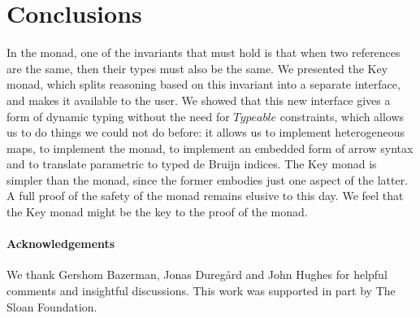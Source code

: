 \documentclass{sigplanconf}
\newcommand{\Conid}[1]{\mathit{#1}}
\begin{document}
\section{Conclusions}

In the \st{} monad, one of the invariants that must hold is that when two references are the same, then their types must also be the same. We presented the Key monad, which splits reasoning based on this invariant into a separate interface, and makes it available to the user. We showed that this new interface gives a form of dynamic typing without the need for \ensuremath{\Conid{Typeable}} constraints, which allows us to do things we could not do before: it allows us to implement heterogeneous maps, to implement the \st{} monad, to implement an embedded form of arrow syntax and to translate parametric \hoas{} to typed de Bruijn indices. The Key monad is simpler than the \st{} monad, since the former embodies just one aspect of the latter. A full proof of the safety of the \st{} monad remains elusive to this day. We feel that the Key monad might be the key to the proof of the \st{} monad. 

\paragraph{Acknowledgements}
We thank Gershom Bazerman, Jonas Dure\-g{\aa}rd and John Hughes for helpful comments and insightful discussions. This work was supported in part by The Sloan Foundation.
\label{conc}


\end{document}
